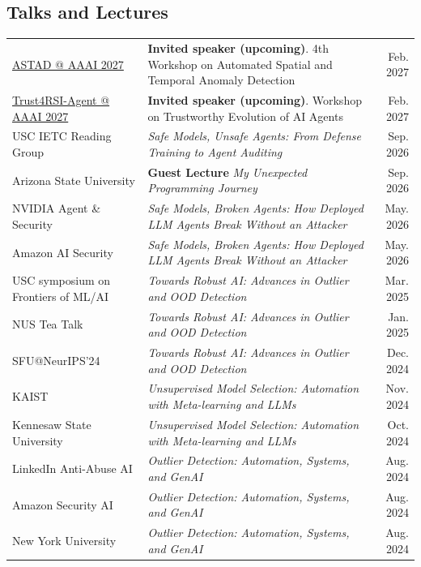 \documentclass[margin,line,pifont,palatino,courier]{res}
\begin{document}
\begin{resume}
\section{{\sc Talks and Lectures} \\ 
} %
\vskip 1mm
\begin{tabularx}{\textwidth}{@{}p{1.6in}Xr@{}}
\href{https://ismart.ece.mcgill.ca/astad4/}{ASTAD @ AAAI 2027} & \textbf{Invited speaker (upcoming)}. 4th Workshop on Automated Spatial and Temporal Anomaly Detection & \hfill Feb. 2027 \\
\href{https://trust4rsi-agent.github.io/AAAI2027/}{Trust4RSI-Agent @ AAAI 2027} & \textbf{Invited speaker (upcoming)}. Workshop on Trustworthy Evolution of AI Agents & \hfill Feb. 2027 \\
USC IETC Reading Group & \textit{Safe Models, Unsafe Agents: From Defense Training to Agent Auditing} & \hfill Sep. 2026 \\
Arizona State University & \textbf{Guest Lecture} \textit{My Unexpected Programming Journey} & \hfill Sep. 2026 \\
NVIDIA Agent \& Security & \textit{Safe Models, Broken Agents: How Deployed LLM Agents Break Without an Attacker} & \hfill May. 2026 \\
Amazon AI Security & \textit{Safe Models, Broken Agents: How Deployed LLM Agents Break Without an Attacker} & \hfill May. 2026 \\
USC symposium on Frontiers of ML/AI & \textit{Towards Robust AI: Advances in Outlier and OOD Detection} & \hfill Mar. 2025 \\
NUS Tea Talk & \textit{Towards Robust AI: Advances in Outlier and OOD Detection} & \hfill Jan. 2025 \\
SFU@NeurIPS'24 & \textit{Towards Robust AI: Advances in Outlier and OOD Detection} & \hfill Dec. 2024 \\
KAIST & \textit{Unsupervised Model Selection: Automation with Meta-learning and LLMs} & \hfill Nov. 2024 \\
Kennesaw State University & \textit{Unsupervised Model Selection: Automation with Meta-learning and LLMs} & \hfill Oct. 2024 \\
LinkedIn Anti-Abuse AI & \textit{Outlier Detection: Automation, Systems, and GenAI} & \hfill Aug. 2024 \\
Amazon Security AI & \textit{Outlier Detection: Automation, Systems, and GenAI} & \hfill Aug. 2024 \\
New York University & \textit{Outlier Detection: Automation, Systems, and GenAI} & \hfill Aug. 2024 \\

\end{tabularx}
\end{resume}
\end{document}
